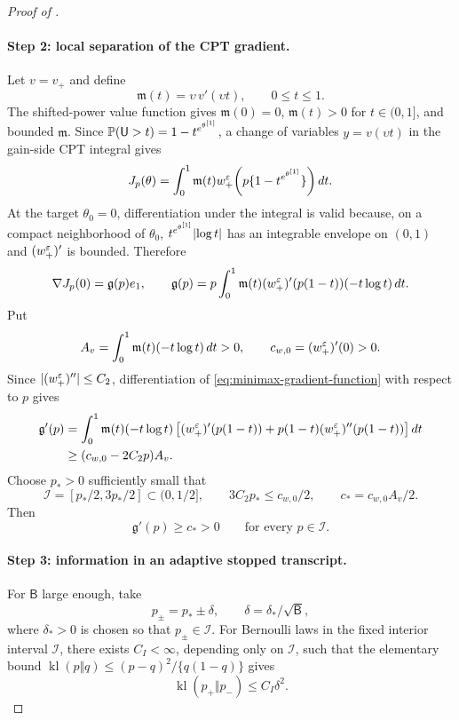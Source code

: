 \begin{proof}[Proof of ]
\paragraph{Step 2: local separation of the CPT gradient.}
Let $v=v_+$ and define
\[
 \mathfrak m(t)=\upsilon\,v'(\upsilon t),\qquad 0\le t\le1.
\]
The shifted-power value function gives $\mathfrak m(0)=0$, $\mathfrak m(t)>0$ for $t\in(0,1]$, and bounded $\mathfrak m$.  Since
$\mathbb P(\mathsf U>t)=1-t^{e^{\theta^{[1]}}}$, a change of variables $y=v(\upsilon t)$ in the gain-side CPT integral gives
\begin{equation}\label{eq:minimax-cpt-submodel}
 J_p(\theta)
 =\int_0^1 \mathfrak m(t)
 w_+^\varepsilon\!\left(p\{1-t^{e^{\theta^{[1]}}}\}\right)dt.
\end{equation}
At the target $\theta_0=0$, differentiation under the integral is valid because, on a compact neighborhood of $\theta_0$,
$t^{e^{\theta^{[1]}}}\lvert\log t\rvert$ has an integrable envelope on $(0,1)$ and $(w_+^\varepsilon)'$ is bounded.  Therefore
\begin{equation}\label{eq:minimax-gradient-function}
 \nabla J_p(0)=\mathfrak g(p)e_1,
 \qquad
 \mathfrak g(p)
 =p\int_0^1\mathfrak m(t)(w_+^\varepsilon)'(p(1-t))(-t\log t)\,dt.
\end{equation}
Put
\[
 A_v=\int_0^1\mathfrak m(t)(-t\log t)\,dt>0,
 \qquad
 c_{w,0}=(w_+^\varepsilon)'(0)>0.
\]
Since $\lvert(w_+^\varepsilon)''\rvert\le C_2$, differentiation of \eqref{eq:minimax-gradient-function} with respect to $p$ gives
\begin{align*}
 \mathfrak g'(p)
 &=\int_0^1\mathfrak m(t)(-t\log t)
 \left[(w_+^\varepsilon)'(p(1-t))+p(1-t)(w_+^\varepsilon)''(p(1-t))\right]dt\\
 &\ge (c_{w,0}-2C_2p)A_v.
\end{align*}
Choose $p_*>0$ sufficiently small that
\[
 \mathcal I=[p_*/2,3p_*/2]\subset(0,1/2],
 \qquad
 3C_2p_*\le c_{w,0}/2,
 \qquad
 c_*=c_{w,0}A_v/2.
\]
Then
\begin{equation}\label{eq:minimax-gradient-separation}
 \mathfrak g'(p)\ge c_*>0
 \qquad\text{for every }p\in\mathcal I.
\end{equation}

\paragraph{Step 3: information in an adaptive stopped transcript.}
For $\mathsf B$ large enough, take
\[
 p_\pm=p_*\pm\delta,
 \qquad
 \delta=\delta_*/\sqrt{\mathsf B},
\]
where $\delta_*>0$ is chosen so that $p_\pm\in\mathcal I$.  For Bernoulli laws in the fixed interior interval $\mathcal I$, there exists
$C_I<\infty$, depending only on $\mathcal I$, such that the elementary bound
$\operatorname{kl}(p\Vert q)\le (p-q)^2/\{q(1-q)\}$ gives
\begin{equation}\label{eq:bernoulli-kl-bound}
 \operatorname{kl}(p_+\Vert p_-)
 \le C_I\delta^2.
\end{equation}


\end{proof}
